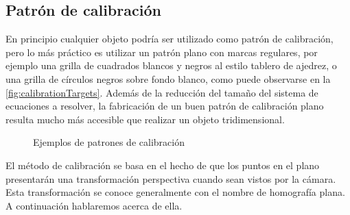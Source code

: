 \subsection{Patrón de calibración}

En principio cualquier objeto podría ser utilizado como patrón de calibración, pero lo más práctico es utilizar un patrón plano con marcas regulares, por ejemplo una grilla de cuadrados blancos y negros al estilo tablero de ajedrez, o una grilla de círculos negros sobre fondo blanco, como puede observarse en la \autoref{fig:calibrationTargets}. Además de la reducción del tamaño del sistema de ecuaciones a resolver, la fabricación de un buen patrón de calibración plano resulta mucho más accesible que realizar un objeto tridimensional.
\begin{figure}[bth]
        \myfloatalign
         \quad \quad
        \caption[Distorsión]{Ejemplos de patrones de calibración}\label{fig:calibrationTargets}
\end{figure}

El método de calibración se basa en el hecho de que los puntos en el plano presentarán una transformación perspectiva cuando sean vistos por la cámara. Esta transformación se conoce generalmente con el nombre de homografía plana. A continuación hablaremos acerca de ella.


